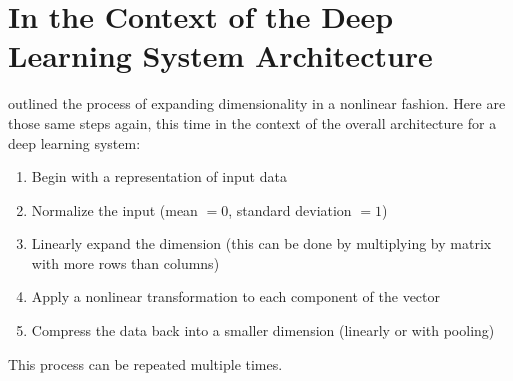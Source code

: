\section{In the Context of the Deep Learning System Architecture}

 outlined the process of expanding dimensionality in a nonlinear fashion.
Here are those same steps again, this time in the context of the overall architecture for a deep learning system:
\begin{enumerate}
    \item Begin with a representation of input data
    \item Normalize the input (mean $= 0$, standard deviation $= 1$)
    \item Linearly expand the dimension (this can be done by multiplying by matrix with more rows than columns)
    \item Apply a nonlinear transformation to each component of the vector
    \item Compress the data back into a smaller dimension (linearly or with pooling)
\end{enumerate}
This process can be repeated multiple times.

